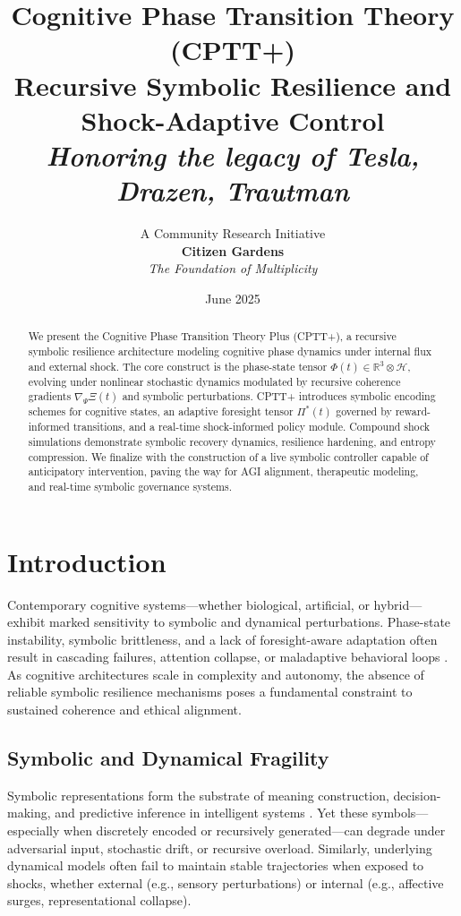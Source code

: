 \documentclass[12pt]{article}
\title{\textbf{Cognitive Phase Transition Theory (CPTT+)\\ \large Recursive Symbolic Resilience and Shock-Adaptive Control \\ \large \textit{Honoring the legacy of Tesla, Drazen, Trautman}}}
\author{\large A Community Research Initiative \\ \textbf{ Citizen Gardens} \\ \textit {The Foundation of Multiplicity}}
\date{June 2025}
\begin{document}
\maketitle

\begin{abstract}
We present the Cognitive Phase Transition Theory Plus (CPTT+), a recursive symbolic resilience architecture modeling cognitive phase dynamics under internal flux and external shock. The core construct is the phase-state tensor $\Phi(t) \in \mathbb{R}^3 \otimes \mathcal{H}$, evolving under nonlinear stochastic dynamics modulated by recursive coherence gradients $\nabla_{\Psi} \Xi(t)$ and symbolic perturbations. CPTT+ introduces symbolic encoding schemes for cognitive states, an adaptive foresight tensor $\Pi^*(t)$ governed by reward-informed transitions, and a real-time shock-informed policy module. Compound shock simulations demonstrate symbolic recovery dynamics, resilience hardening, and entropy compression. We finalize with the construction of a live symbolic controller capable of anticipatory intervention, paving the way for AGI alignment, therapeutic modeling, and real-time symbolic governance systems.
\end{abstract}

\section{Introduction}

Contemporary cognitive systems—whether biological, artificial, or hybrid—exhibit marked sensitivity to symbolic and dynamical perturbations. Phase-state instability, symbolic brittleness, and a lack of foresight-aware adaptation often result in cascading failures, attention collapse, or maladaptive behavioral loops \cite{chollet2019measure, amodei2016concrete}. As cognitive architectures scale in complexity and autonomy, the absence of reliable symbolic resilience mechanisms poses a fundamental constraint to sustained coherence and ethical alignment.

\subsection*{Symbolic and Dynamical Fragility}

Symbolic representations form the substrate of meaning construction, decision-making, and predictive inference in intelligent systems \cite{wang2021symbolic, bengio2013representation}. Yet these symbols—especially when discretely encoded or recursively generated—can degrade under adversarial input, stochastic drift, or recursive overload. Similarly, underlying dynamical models often fail to maintain stable trajectories when exposed to shocks, whether external (e.g., sensory perturbations) or internal (e.g., affective surges, representational collapse).
\end{document}
